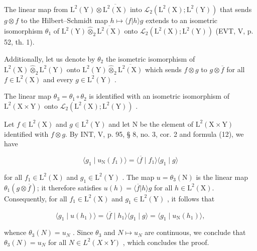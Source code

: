 The linear map from \(\mathrm{L}^{2}(\mathrm{Y})\otimes\overline{\mathrm{L}^{2}(\mathrm{X})}\) into \(\mathcal{L}_{2}(\mathrm{L}^{2}(\mathrm{X});\mathrm{L}^{2}(\mathrm{Y}))\) that sends \(g\otimes f\) to the Hilbert--Schmidt map \(h\mapsto\langle f|h\rangle g\) extends to an isometric isomorphism \(\theta_{1}\) of \(\mathrm{L}^{2}(\mathrm{Y})\widehat{\otimes}_{2}\overline{\mathrm{L}^{2}(\mathrm{X})}\) onto \(\mathcal{L}_{2}(\mathrm{L}^{2}(\mathrm{X});\mathrm{L}^{2}(\mathrm{Y}))\) (EVT, V, p. 52, th. 1).

Additionally, let us denote by \(\theta_{2}\) the isometric isomorphism of \(\mathrm{L}^{2}(\mathrm{X})\widehat{\otimes}_{2}\mathrm{L}^{2}(\mathrm{Y})\) onto \(\mathrm{L}^{2}(\mathrm{Y})\widehat{\otimes}_{2}\overline{\mathrm{L}^{2}(\mathrm{X})}\) which sends \(f\otimes g\) to \(g\otimes \overline{f}\) for all \(f\in \mathrm{L}^2 (\mathrm{X})\) and every \(g\in \mathrm{L}^2 (\mathrm{Y})\) .

The linear map \(\theta_{3} = \theta_{1} \circ \theta_{2}\) is identified with an isometric isomorphism of \(\mathrm{L}^{2}(\mathrm{X} \times \mathrm{Y})\) onto \(\mathcal{L}_{2}(\mathrm{L}^{2}(\mathrm{X}); \mathrm{L}^{2}(\mathrm{Y}))\) .

Let \(f \in \mathrm{L}^2(\mathrm{X})\) and \(g \in \mathrm{L}^2(\mathrm{Y})\) and let \(\mathrm{N}\) be the element of \(\mathrm{L}^2(\mathrm{X} \times \mathrm{Y})\) identified with \(f \otimes g\). By INT, V, p. 95, § 8, no. 3, cor. 2 and formula (12), we have

\[
\langle g _ {1} \mid u _ {\mathrm{N}} (f _ {1}) \rangle = \langle \overline {{f}} \mid f _ {1} \rangle \langle g _ {1} \mid g \rangle
\]

for all \(f_1 \in \mathrm{L}^2(\mathrm{X})\) and \(g_1 \in \mathrm{L}^2(\mathrm{Y})\) . The map \(u = \theta_3(\mathrm{N})\) is the linear map \(\theta_1(g \otimes \overline{f})\); it therefore satisfies \(u(h) = \langle \overline{f} | h \rangle g\) for all \(h \in \mathrm{L}^2(\mathrm{X})\). Consequently, for all \(f_1 \in \mathrm{L}^2(\mathrm{X})\) and \(g_1 \in \mathrm{L}^2(\mathrm{Y})\) , it follows that

\[
\langle g _ {1} \mid u (h _ {1}) \rangle = \langle \overline {{f}} \mid h _ {1} \rangle \langle g _ {1} \mid g \rangle = \langle g _ {1} \mid u _ {\mathrm{N}} (h _ {1}) \rangle ,
\]

whence \(\theta_3(N) = u_N\) . Since \(\theta_3\) and \(N \mapsto u_N\) are continuous, we conclude that \(\theta_3(N) = u_N\) for all \(N \in L^2(X \times Y)\) , which concludes the proof.

